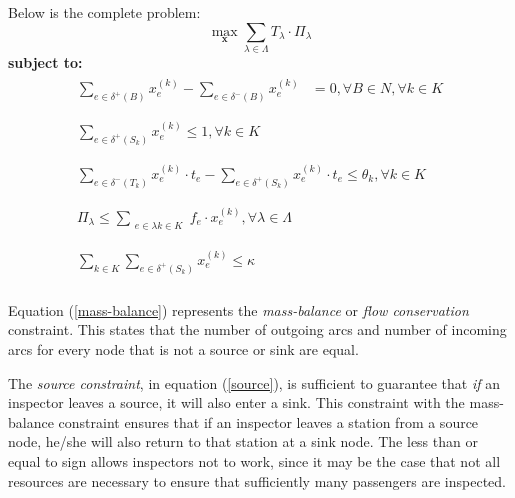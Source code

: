 \documentclass[11pt]{article}
\begin{document}
Below is the complete problem: 
\begin{equation}
    \max_{\textbf{x}} \sum_{\lambda\in\Lambda}T_\lambda\cdot \Pi_\lambda
\end{equation}
\textbf{subject to:}
\begin{align}
\begin{split}\label{mass-balance}
     \sum_{e\in\delta^+(B)}x_e^{(k)} - \sum_{e\in\delta^-(B)}x_e^{(k)} &= 0, \forall B\in N, \forall k\in K\\
\end{split}\\
\begin{split}\label{source}
         \sum_{e\in\delta^+(S_k)}x_e^{(k)}
         \le 1, \forall k\in K\\
\end{split}\\
\begin{split}\label{time-flow}
          \sum_{e\in\delta^-(T_k)}x_e^{(k)}\cdot t_e - \sum_{e\in\delta^+(S_k)}x_e^{(k)}\cdot t_e 
          \le \theta_k, \forall k\in K\\
\end{split}\\
\begin{split}\label{minimum}
        \Pi_\lambda 
        \le \sum_{\substack{e\in\lambda k \in K}}f_e\cdot x_e^{(k)}, \forall\lambda\in\Lambda\\
\end{split}\\
\begin{split}\label{max_num_insps}
        \sum_{k\in K} \sum_{e\in\delta^+(S_k)}x_e^{(k)}
        \le \kappa\\
\end{split}
\end{align}

Equation (\ref{mass-balance}) represents the \textit{mass-balance} or \textit{flow conservation} constraint. This states that the number of outgoing arcs and number of incoming arcs for every node that is not a source or sink are equal.

The \textit{source constraint}, in equation (\ref{source}), is sufficient to guarantee that \textit{if} an inspector leaves a source, it will also enter a sink. This constraint with the mass-balance constraint ensures that if an inspector leaves a station from a source node, he/she will also return to that station at a sink node. The less than or equal to sign allows inspectors not to work, since it may be the case that not all resources are necessary to ensure that sufficiently many passengers are inspected.
\end{document}
